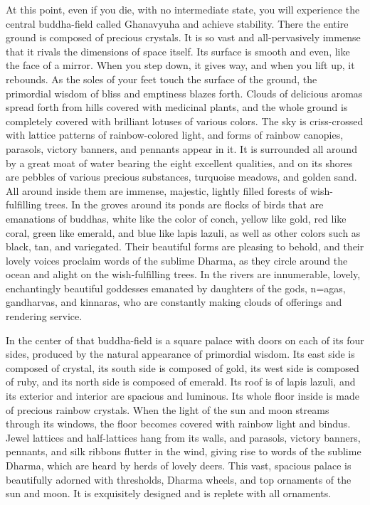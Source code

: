 \documentclass[11pt,twocolumn]{article}
\begin{document}
At this point, even if you die, with no intermediate state, you will
experience the central buddha\hyp{}field called Ghanavyuha and achieve
stability. There the entire ground is composed of precious
crystals. It is so vast and all\hyp{}pervasively immense that it
rivals the dimensions of space itself. Its surface is smooth and even,
like the face of a mirror. When you step down, it gives way, and when
you lift up, it rebounds. As the soles of your feet touch the surface
of the ground, the primordial wisdom of bliss and emptiness blazes
forth. Clouds of delicious aromas spread forth from hills covered with
medicinal plants, and the whole ground is completely covered with
brilliant lotuses of various colors. The sky is criss\hyp{}crossed
with lattice patterns of rainbow\hyp{}colored light, and forms of
rainbow canopies, parasols, victory banners, and pennants appear in
it. It is surrounded all around by a great moat of water bearing the
eight excellent qualities, and on its shores are pebbles of various
precious substances, turquoise meadows, and golden sand. All around
inside them are immense, majestic, lightly filled forests of
wish\hyp{}fulfilling trees.  In the groves around its ponds are flocks
of birds that are emanations of buddhas, white like the color of
conch, yellow like gold, red like coral, green like emerald, and blue
like lapis lazuli, as well as other colors such as black, tan, and
variegated. Their beautiful forms are pleasing to behold, and their
lovely voices proclaim words of the sublime Dharma, as they circle
around the ocean and alight on the wish\hyp{}fulfilling trees. In the
rivers are innumerable, lovely, enchantingly beautiful goddesses
emanated by daughters of the gods, n\a={a}gas, gandharvas, and
kinnaras, who are constantly making clouds of offerings and rendering
service.

In the center of that buddha\hyp{}field is a square palace with doors
on each of its four sides, produced by the natural appearance of
primordial wisdom. Its east side is composed of crystal, its south
side is composed of gold, its west side is composed of ruby, and its
north side is composed of emerald. Its roof is of lapis lazuli, and
its exterior and interior are spacious and luminous. Its whole floor
inside is made of precious rainbow crystals. When the light of the sun
and moon streams through its windows, the floor becomes covered with
rainbow light and bindus. Jewel lattices and half\hyp{}lattices hang
from its walls, and parasols, victory banners, pennants, and silk
ribbons flutter in the wind, giving rise to words of the sublime
Dharma, which are heard by herds of lovely deers. This vast, spacious
palace is beautifully adorned with thresholds, Dharma wheels, and top
ornaments of the sun and moon. It is exquisitely designed and is
replete with all ornaments.
\end{document}
